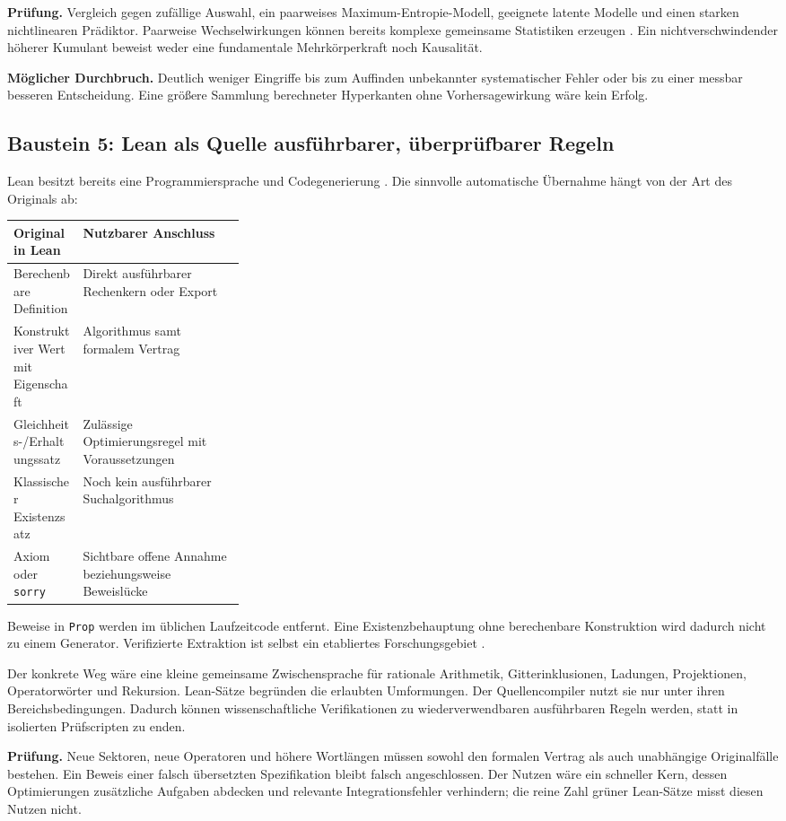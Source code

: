 \textbf{Prüfung.} Vergleich gegen zufällige Auswahl, ein paarweises Maximum-Entropie-Modell, geeignete latente Modelle und einen starken nichtlinearen Prädiktor. Paarweise Wechselwirkungen können bereits komplexe gemeinsame Statistiken erzeugen \cite{schneidman2006}. Ein nichtverschwindender höherer Kumulant beweist weder eine fundamentale Mehrkörperkraft noch Kausalität.

\textbf{Möglicher Durchbruch.} Deutlich weniger Eingriffe bis zum Auffinden unbekannter systematischer Fehler oder bis zu einer messbar besseren Entscheidung. Eine größere Sammlung berechneter Hyperkanten ohne Vorhersagewirkung wäre kein Erfolg.

\subsection{Baustein 5: Lean als Quelle ausführbarer, überprüfbarer Regeln}
Lean besitzt bereits eine Programmiersprache und Codegenerierung \cite{lean}. Die sinnvolle automatische Übernahme hängt von der Art des Originals ab:
\begin{center}
\begin{tabularx}{\linewidth}{L{0.30\linewidth}Y}
\toprule
Original in Lean & Nutzbarer Anschluss\\\midrule
Berechenbare Definition & Direkt ausführbarer Rechenkern oder Export\\
Konstruktiver Wert mit Eigenschaft & Algorithmus samt formalem Vertrag\\
Gleichheits-/Erhaltungssatz & Zulässige Optimierungsregel mit Voraussetzungen\\
Klassischer Existenzsatz & Noch kein ausführbarer Suchalgorithmus\\
Axiom oder \texttt{sorry} & Sichtbare offene Annahme beziehungsweise Beweislücke\\\bottomrule
\end{tabularx}
\end{center}

Beweise in \texttt{Prop} werden im üblichen Laufzeitcode entfernt. Eine Existenzbehauptung ohne berechenbare Konstruktion wird dadurch nicht zu einem Generator. Verifizierte Extraktion ist selbst ein etabliertes Forschungsgebiet \cite{metacoq}.

Der konkrete Weg wäre eine kleine gemeinsame Zwischensprache für rationale Arithmetik, Gitterinklusionen, Ladungen, Projektionen, Operatorwörter und Rekursion. Lean-Sätze begründen die erlaubten Umformungen. Der Quellencompiler nutzt sie nur unter ihren Bereichsbedingungen. Dadurch können wissenschaftliche Verifikationen zu wiederverwendbaren ausführbaren Regeln werden, statt in isolierten Prüfscripten zu enden.

\textbf{Prüfung.} Neue Sektoren, neue Operatoren und höhere Wortlängen müssen sowohl den formalen Vertrag als auch unabhängige Originalfälle bestehen. Ein Beweis einer falsch übersetzten Spezifikation bleibt falsch angeschlossen. Der Nutzen wäre ein schneller Kern, dessen Optimierungen zusätzliche Aufgaben abdecken und relevante Integrationsfehler verhindern; die reine Zahl grüner Lean-Sätze misst diesen Nutzen nicht.

